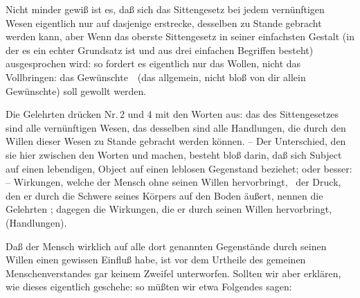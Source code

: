 \begin{aufza}
\item Nicht minder gewiß ist es, daß sich das Sittengesetz bei jedem vernünftigen Wesen eigentlich nur auf dasjenige erstrecke,  desselben zu Stande gebracht werden kann, aber  Wenn das oberste Sittengesetz in seiner einfachsten Gestalt (in der es ein echter Grundsatz ist und aus drei einfachen Begriffen besteht) ausgesprochen wird: so fordert es eigentlich nur das Wollen, nicht das Vollbringen: das Gewünschte~\ (das allgemein, nicht bloß von dir allein Gewünschte) soll gewollt werden.
\begin{RWanm} 
Die Gelehrten drücken Nr.\,2 und 4 mit den Worten aus: das  des Sittengesetzes sind alle vernünftigen Wesen, das  desselben sind alle Handlungen, die durch den Willen dieser Wesen zu Stande gebracht werden können. -- Der Unterschied, den sie hier zwischen den Worten  und  machen, besteht bloß darin, daß sich Subject auf einen lebendigen, Object auf einen leblosen Gegenstand beziehet; oder besser:  -- Wirkungen, welche der Mensch ohne seinen Willen hervorbringt, \zB\  der Druck, den er durch die Schwere seines Körpers auf den Boden äußert, nennen die Gelehrten ; dagegen die Wirkungen, die er durch seinen Willen hervorbringt,  (Handlungen).
\end{RWanm}
\item Daß der Mensch wirklich auf alle dort genannten Gegenstände durch seinen Willen einen gewissen Einfluß habe, ist vor dem Urtheile des gemeinen Menschenverstandes gar keinem Zweifel unterworfen. Sollten wir aber erklären, wie dieses eigentlich geschehe: so müßten wir etwa Folgendes sagen:
\begin{aufzb}

\end{aufzb}
\end{aufza}
